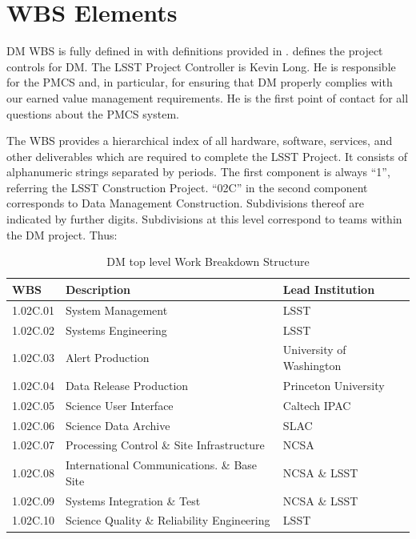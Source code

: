 \section{WBS Elements } \label{sect:WBS}

DM WBS is fully defined in  with definitions provided in . 
 defines the project controls for DM. The LSST Project Controller is Kevin Long. He is responsible for the PMCS and, in particular, for ensuring that DM properly complies with
our earned value management requirements. He is the first point of contact for
all questions about the PMCS system.


The WBS provides a hierarchical index of all hardware, software, services, and
other deliverables which are required to complete the LSST Project. It
consists of alphanumeric strings separated by periods. The first component is
always “1”, referring the LSST Construction Project. “02C” in the second
component corresponds to Data Management Construction. Subdivisions thereof
are indicated by further digits. Subdivisions at this level correspond to
teams within the DM project. Thus:

\begin{table}
\caption{DM top level Work Breakdown Structure \label{tab:wbs}}
\begin{tabular}[htb]{l|l|l}\\ \hline
{\bf WBS}    &  {\bf Description}   &                            {\bf Lead Institution}\\ \hline
	1.02C.01& System Management                       &  LSST\\ \hline
	1.02C.02& Systems Engineering                     &  LSST\\ \hline
	1.02C.03& Alert Production                        &  University of Washington\\ \hline
	1.02C.04& Data Release Production                 &  Princeton University\\ \hline
	1.02C.05& Science User Interface                  &  Caltech IPAC\\ \hline
	1.02C.06& Science Data Archive                    &  SLAC\\ \hline
	1.02C.07& Processing Control \& Site Infrastructure & NCSA\\ \hline
	1.02C.08& International Communications. \& Base Site& NCSA \& LSST\\ \hline
	1.02C.09& Systems Integration \& Test               & NCSA \& LSST\\ \hline
	1.02C.10& Science Quality \& Reliability Engineering& LSST\\ \hline
\end{tabular}
\end{table}

